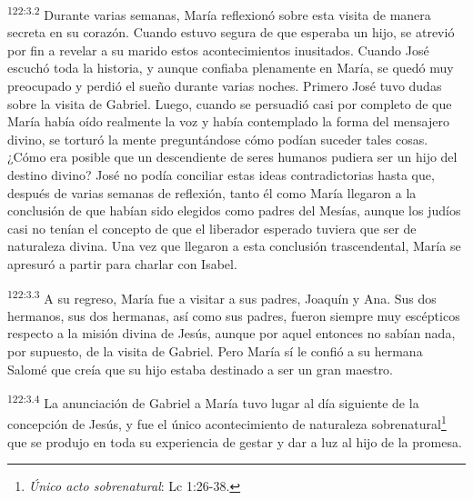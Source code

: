\par
\textsuperscript{122:3.2} Durante varias semanas, María reflexionó sobre esta visita de manera secreta en su corazón. Cuando estuvo segura de que esperaba un hijo, se atrevió por fin a revelar a su marido estos acontecimientos inusitados. Cuando José escuchó toda la historia, y aunque confiaba plenamente en María, se quedó muy preocupado y perdió el sueño durante varias noches. Primero José tuvo dudas sobre la visita de Gabriel. Luego, cuando se persuadió casi por completo de que María había oído realmente la voz y había contemplado la forma del mensajero divino, se torturó la mente preguntándose cómo podían suceder tales cosas. ¿Cómo era posible que un descendiente de seres humanos pudiera ser un hijo del destino divino? José no podía conciliar estas ideas contradictorias hasta que, después de varias semanas de reflexión, tanto él como María llegaron a la conclusión de que habían sido elegidos como padres del Mesías, aunque los judíos casi no tenían el concepto de que el liberador esperado tuviera que ser de naturaleza divina. Una vez que llegaron a esta conclusión trascendental, María se apresuró a partir para charlar con Isabel.

\par
\textsuperscript{122:3.3} A su regreso, María fue a visitar a sus padres, Joaquín y Ana. Sus dos hermanos, sus dos hermanas, así como sus padres, fueron siempre muy escépticos respecto a la misión divina de Jesús, aunque por aquel entonces no sabían nada, por supuesto, de la visita de Gabriel. Pero María sí le confió a su hermana Salomé que creía que su hijo estaba destinado a ser un gran maestro.

\par
\textsuperscript{122:3.4} La anunciación de Gabriel a María tuvo lugar al día siguiente de la concepción de Jesús, y fue el único acontecimiento de naturaleza sobrenatural\footnote{\textit{Único acto sobrenatural}: Lc 1:26-38.} que se produjo en toda su experiencia de gestar y dar a luz al hijo de la promesa.

